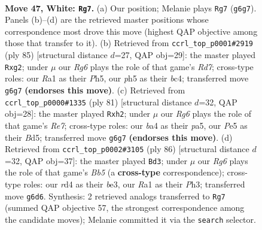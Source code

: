 \documentclass[11pt]{article}
\begin{document}
\clearpage

\begin{figure}[p]\centering
\begin{subfigure}{0.46\textwidth}\centering
\resizebox{\linewidth}{!}{%
\newchessgame
\chessboard[
  setfen={r7/1p3B2/p5R1/4Pk1p/bP1r4/P6K/8/R7 w - - 7 47},
  showmover=false,
  pgfstyle=straightmove, color=movearrow, markmove={g6-g7}
]}
\caption{}
\end{subfigure}\hfill
\begin{subfigure}{0.46\textwidth}\centering
\resizebox{\linewidth}{!}{%
\newchessgame
\chessboard[
  setfen={8/6pk/5p2/R6p/2B1Pb1P/5P2/3r2P1/4K3 b - - 2 43},
  showmover=false,
  pgfstyle=straightmove, color=movearrow, markmove={d2-g2}
]}
\caption{}
\end{subfigure}
\\[4pt]
\begin{subfigure}{0.46\textwidth}\centering
\resizebox{\linewidth}{!}{%
\newchessgame
\chessboard[
  setfen={5k2/8/p5R1/P2b4/1P6/2B2p1P/4r2P/5K2 b - - 2 41},
  showmover=false,
  pgfstyle=straightmove, color=movearrow, markmove={e2-h2}
]}
\caption{}
\end{subfigure}\hfill
\begin{subfigure}{0.46\textwidth}\centering
\resizebox{\linewidth}{!}{%
\newchessgame
\chessboard[
  setfen={2k5/3R1p2/1rP1p1p1/1B4P1/1P5p/4b2P/6K1/8 w - - 1 44},
  showmover=false,
  pgfstyle=straightmove, color=movearrow, markmove={b5-d3}
]}
\caption{}
\end{subfigure}
\caption{\textbf{Move 47, White: \texttt{Rg7}.} (a) Our position; Melanie plays \texttt{Rg7} (\texttt{g6g7}). Panels (b)--(d) are the retrieved master positions whose correspondence most drove this move (highest QAP objective among those that transfer to it). (b) Retrieved from \texttt{ccrl\_top\_p0001\#2919} (ply 85) [structural distance $d$=27, QAP obj=29]: the master played \texttt{Rxg2}; under $\mu$ our \emph{Rg6} plays the role of that game's \emph{Rd7}; cross-type roles: our \emph{R}a1 as their \emph{P}h5, our \emph{p}h5 as their \emph{b}c4; transferred move \texttt{g6g7} \textbf{(endorses this move)}. (c) Retrieved from \texttt{ccrl\_top\_p0000\#1335} (ply 81) [structural distance $d$=32, QAP obj=28]: the master played \texttt{Rxh2}; under $\mu$ our \emph{Rg6} plays the role of that game's \emph{Re7}; cross-type roles: our \emph{b}a4 as their \emph{p}a5, our \emph{P}e5 as their \emph{B}d5; transferred move \texttt{g6g7} \textbf{(endorses this move)}. (d) Retrieved from \texttt{ccrl\_top\_p0002\#3105} (ply 86) [structural distance $d$=32, QAP obj=37]: the master played \texttt{Bd3}; under $\mu$ our \emph{Rg6} plays the role of that game's \emph{Bb5} (a \textbf{cross-type} correspondence); cross-type roles: our \emph{r}d4 as their \emph{b}e3, our \emph{R}a1 as their \emph{P}h3; transferred move \texttt{g6d6}. Synthesis: 2 retrieved analogs transferred to \texttt{Rg7} (summed QAP objective 57, the strongest correspondence among the candidate moves); Melanie committed it via the \texttt{search} selector.}
\label{fig:thought-m92}
\end{figure}
\end{document}
